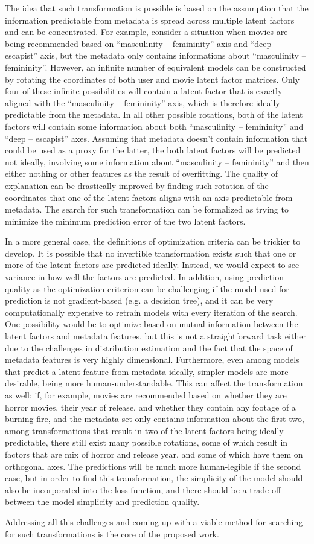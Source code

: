 The idea that such transformation is possible is based on the assumption that
the information predictable from metadata is spread across multiple latent
factors and can be concentrated. For example, consider a situation when movies
are being recommended based on ``masculinity -- femininity'' axis and
``deep -- escapist'' axis, but the metadata only contains informations about
``masculinity -- femininity''. However, an infinite number of equivalent models
can be constructed by rotating the coordinates of both user and movie latent
factor matrices. Only four of these infinite possibilities will contain a latent
factor that is exactly aligned with the ``masculinity -- femininity'' axis,
which is therefore ideally predictable from the metadata. In all other possible
rotations, both of the latent factors will contain some information about both
``masculinity -- femininity'' and ``deep -- escapist'' axes. Assuming that
metadata doesn't contain information that could be used as a proxy for the
latter, the both latent factors will be predicted not ideally, involving some
information about ``masculinity -- femininity'' and then either nothing or
other features as the result of overfitting. The quality of explanation can be
drastically improved by finding such rotation of the coordinates that one of the
latent factors aligns with an axis predictable from metadata. The search for
such transformation can be formalized as trying to minimize the minimum
prediction error of the two latent factors.

In a more general case, the definitions of optimization criteria can be trickier
to develop. It is possible that no invertible transformation exists such that
one or more of the latent factors are predicted ideally. Instead, we would
expect to see variance in how well the factors are predicted. In addition, using
prediction quality as the optimization criterion can be challenging if the
model used for prediction is not gradient-based (e.g. a decision tree), and it
can be very computationally expensive to retrain models with every iteration of
the search. One possibility would be to optimize based on mutual information
between the latent factors and metadata features, but this is not a
straightforward task either due to the challenges in distribution estimation and
the fact that the space of metadata features is very highly dimensional.
Furthermore, even among models that predict a latent feature from metadata
ideally, simpler models are more desirable, being more human-understandable.
This can affect the transformation as well: if, for example, movies are
recommended based on whether they are horror movies, their year of release, and
whether they contain any footage of a burning fire, and the metadata set only
contains information about the first two, among transformations that result in
two of the latent factors being ideally predictable, there still exist many
possible rotations, some of which result in factors that are mix of horror and
release year, and some of which have them on orthogonal axes. The predictions
will be much more human-legible if the second case, but in order to find this
transformation, the simplicity of the model should also be incorporated into the
loss function, and there should be a trade-off between the model simplicity and
prediction quality.

Addressing all this challenges and coming up with a viable method for searching
for such transformations is the core of the proposed work.
